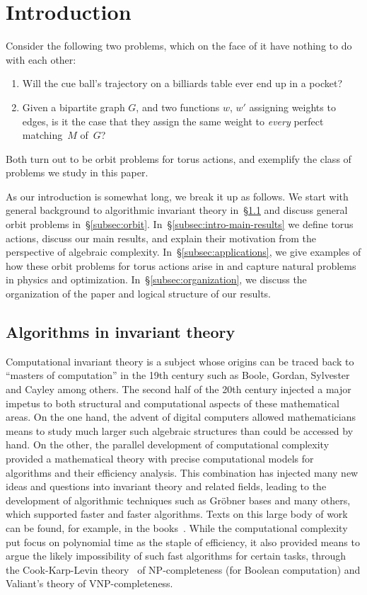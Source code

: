 \section{Introduction} \label{sec:intro}
%
Consider the following two problems, which on the face of it have nothing to do with each other:
\begin{enumerate}
\item Will the cue ball's trajectory on a billiards table ever end up in a pocket?
\item Given a bipartite graph $G$, and two functions $w$, $w'$ assigning weights to edges, is it the case that they assign the same weight to \emph{every} perfect matching~$M$ of~$G$?
\end{enumerate}
Both turn out to be orbit problems for torus actions, and exemplify the class of problems we study in this paper.

As our introduction is somewhat long, we break it up as follows.
We start with general background to algorithmic invariant theory in~\S\ref{subsec:alg inv th} and discuss general orbit problems in~\S\ref{subsec:orbit}.
In~\S\ref{subsec:intro-main-results} we define torus actions, discuss our main results, and explain their motivation
from the perspective of algebraic complexity.
In~\S\ref{subsec:applications}, we give examples of how these orbit problems for torus actions arise in and capture natural problems in physics and optimization.
In~\S\ref{subsec:organization}, we discuss the organization of the paper and logical structure of our results.

%
\subsection{Algorithms in invariant theory}\label{subsec:alg inv th}
%
%
%
%
%
%
%
%
%
%
%

Computational invariant theory is a subject whose origins can be traced back to
``masters of computation'' in the 19th century such as Boole, Gordan, Sylvester and Cayley among others.
The second half of the 20th century injected a major impetus to both structural and  computational aspects of these mathematical areas.
On the one hand, the advent of digital computers allowed mathematicians means to study much larger such algebraic structures than could be accessed by hand.
On the other, the parallel development of computational complexity provided a mathematical theory with precise computational models for algorithms and
their efficiency analysis.
This combination has injected many new ideas and questions into invariant theory and related fields, leading to the development of algorithmic techniques
such as Gr\"obner bases and many others, which supported faster and faster algorithms.
Texts on this large body of work can be found, for example, in the books~\cite{DK,Sturmfels,Cox-Little-Oshea}.
While the computational complexity put focus on polynomial time as the staple of efficiency, it also provided means to argue
the likely impossibility of such fast algorithms for certain tasks, through the Cook-Karp-Levin theory~\cite{cook:71,karp:72,levin:73}
of NP-completeness (for Boolean computation) and Valiant's theory of VNP-completeness.

